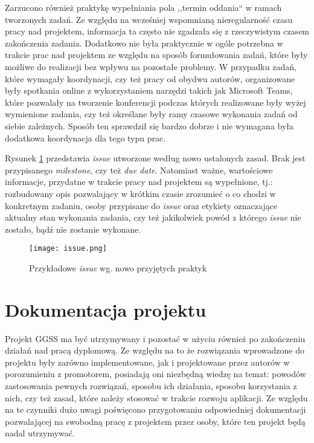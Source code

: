 Zarzucono również praktykę wypełniania pola ,,termin oddania`` w ramach tworzonych zadań. Ze względu na  wcześniej wspomnianą nieregularność czasu pracy nad projektem, informacja ta często nie zgadzała się z rzeczywistym czasem zakończenia zadania. Dodatkowo nie była praktycznie w ogóle potrzebna w trakcie prac nad projektem ze względu na sposób formułowania zadań, które były możliwe do realizacji bez wpływu na pozostałe problemy. W przypadku zadań, które wymagały koordynacji, czy też pracy od obydwu autorów, organizowane były spotkania online z wykorzystaniem narzędzi takich jak Microsoft Teams, które pozwalały na tworzenie konferencji podczas których realizowane były wyżej wymienione zadania, czy też określane były ramy czasowe wykonania zadań od siebie zależnych. Sposób ten sprawdził się bardzo dobrze i nie wymagana była dodatkowa koordynacja dla tego typu prac.

Rysunek \ref{fig:issue} przedstawia \emph{issue} utworzone według nowo ustalonych zasad. Brak jest przypisanego \emph{milestone}, czy też \emph{due date}. Natomiast ważne, wartościowe informacje, przydatne w trakcie pracy nad projektem są wypełnione, tj.: rozbudowany opis pozwalający w krótkim czasie zrozumieć o co chodzi w konkretnym zadaniu, osoby przypisane do \emph{issue} oraz etykiety oznaczające aktualny stan wykonania zadania, czy też jakikolwiek powód z którego \emph{issue} nie zostało, bądź nie zostanie wykonane.

\begin{figure}[H]
    \centering
    \texttt{[image: issue.png]}
    \caption{Przykładowe \emph{issue} wg. nowo przyjętych praktyk}
    \label{fig:issue}
\end{figure}


\newpage
\section{Dokumentacja projektu}

Projekt GGSS ma być utrzymywany i pozostać w użyciu również po zakończeniu działań nad pracą dyplomową. Ze względu na to że rozwiązania wprowadzone do projektu były zarówno implementowane, jak i projektowane przez autorów w porozumieniu z promotorem, posiadają oni niezbędną wiedzę na temat: powodów zastosowania pewnych rozwiązań, sposobu ich działania, sposobu korzystania z nich, czy też zasad, które należy stosować w trakcie rozwoju aplikacji. Ze względu na te czynniki dużo uwagi poświęcono przygotowaniu odpowiedniej dokumentacji pozwalającej na swobodną pracę z projektem przez osoby, które ten projekt będą nadal utrzymywać.

